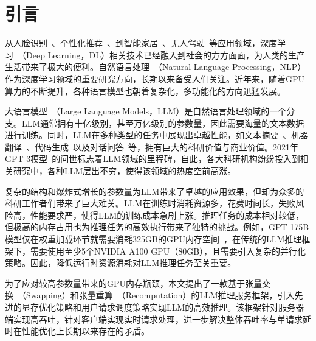 \section{引言}

从人脸识别~\cite{Face-Recognition}、个性化推荐~\cite{Personal-Recommendation}、到智能家居~\cite{Smart-Home}、无人驾驶~\cite{Self-Driving-Car}等应用领域，深度学习~\cite{Deep-Learning}（Deep Learning，DL）相关技术已经融入到社会的方方面面，为人类的生产生活带来了极大的便利。自然语言处理~\cite{NLP}（Natural Language Processing，NLP）作为深度学习领域的重要研究方向，长期以来备受人们关注。近年来，随着GPU算力的不断提升，各种语言模型也朝着复杂化，多功能化的方向迅猛发展。

大语言模型~\cite{LLM}（Large Language Models，LLM）是自然语言处理领域的一个分支。LLM通常拥有十亿级别，甚至万亿级别的参数量，因此需要海量的文本数据进行训练。同时，LLM在多种类型的任务中展现出卓越性能，如文本摘要~\cite{Text-Summarization}、机器翻译~\cite{Machine-Translation}、代码生成~\cite{Code-Generation}以及对话问答~\cite{Question-Answer}等，拥有巨大的科研价值与商业价值。2021年GPT-3模型~\cite{Text-Summarization, GPT3}的问世标志着LLM领域的里程碑，自此，各大科研机构纷纷投入到相关研究中，各种LLM层出不穷，使得该领域的热度空前高涨。

复杂的结构和爆炸式增长的参数量为LLM带来了卓越的应用效果，但却为众多的科研工作者们带来了巨大难关。LLM在训练时消耗资源多，花费时间长，失败风险高，性能要求严，使得LLM的训练成本急剧上涨。推理任务的成本相对较低，但极高的内存占用也为推理任务的高效执行带来了独特的挑战。例如，GPT-175B模型仅在权重加载环节就需要消耗325GB的GPU内存空间~\cite{GPT-175B资源消耗}，在传统的LLM推理框架下，需要使用至少5个NVIDIA A100 GPU（80GB），且需要引入复杂的并行化策略。因此，降低运行时资源消耗对LLM推理任务至关重要。


为了应对较高参数量带来的GPU内存瓶颈，本文提出了一款基于张量交换~\cite{Swapping}（Swapping）和张量重算~\cite{Recomputation}（Recomputation）的LLM推理服务框架，引入先进的显存优化策略和用户请求调度策略实现LLM的高效推理。该框架针对服务器端实现高吞吐，针对客户端实现实时请求处理，进一步解决整体吞吐率与单请求延时在性能优化上长期以来存在的矛盾。

